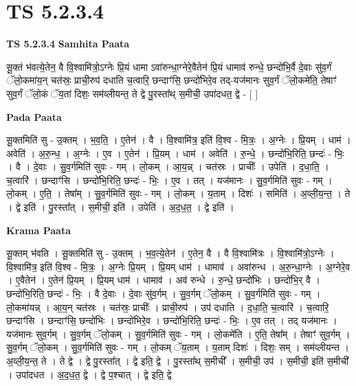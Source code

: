 \documentclass[17pt]{extarticle}
\begin{document}
\section{ TS 5.2.3.4 }

\textbf{TS 5.2.3.4 } \newline
\textbf{Samhita Paata} \newline

सू॒क्तं भ॑वत्ये॒तेन॒ वै वि॒श्वामि॑त्रो॒ऽग्नेः प्रि॒यं धामा ऽवा॑रुन्धा॒ग्नेरे॒वैतेन॑ प्रि॒यं धामाव॑ रुन्धे॒ छन्दो॑भि॒र्वै दे॒वाः सु॑व॒र्गं ॅलो॒कमा॑य॒न् चत॑स्रः॒ प्राची॒रुप॑ दधाति च॒त्वारि॒ छन्दाꣳ॑सि॒ छन्दो॑भिरे॒व तद्-यज॑मानः सुव॒र्गं ॅलो॒कमे॑ति॒ तेषाꣳ॑ सुव॒र्गं ॅलो॒कं ॅय॒तां दिशः॒ सम॑व्लीयन्त॒ ते द्वे पु॒रस्ता᳚थ् स॒मीची॒ उपा॑दधत॒ द्वे - [  ] \newline

\textbf{Pada Paata} \newline

सू॒क्तमिति॑ सु - उ॒क्तम् । भ॒व॒ति॒ । ए॒तेन॑ । वै । वि॒श्वामि॑त्र॒ इति॑ वि॒श्व - मि॒त्रः॒ । अ॒ग्नेः । प्रि॒यम् । धाम॑ । अवेति॑ । अ॒रु॒न्ध॒ । अ॒ग्नेः । ए॒व । ए॒तेन॑ । प्रि॒यम् । धाम॑ । अवेति॑ । रु॒न्धे॒ । छन्दो॑भि॒रिति॒ छन्दः॑ - भिः॒ । वै । दे॒वाः । सु॒व॒र्गमिति॑ सुवः - गम् । लो॒कम् । आ॒य॒न्न् । चत॑स्रः । प्राचीः᳚ । उपेति॑ । द॒धा॒ति॒ । च॒त्वारि॑ । छन्दाꣳ॑सि । छन्दो॑भि॒रिति॒ छन्दः॑ - भिः॒ । ए॒व । तत् । यज॑मानः । सु॒व॒र्गमिति॑ सुवः - गम् । लो॒कम् । ए॒ति॒ । तेषा᳚म् । सु॒व॒र्गमिति॑ सुवः - गम् । लो॒कम् । य॒ताम् । दिशः॑ । समिति॑ । अ॒व्ली॒य॒न्त॒ । ते । द्वे इति॑ । पु॒रस्ता᳚त् । स॒मीची॒ इति॑ । उपेति॑ । अ॒द॒ध॒त॒ । द्वे इति॑ ।  \newline


\textbf{Krama Paata} \newline

सू॒क्तम् भ॑वति । सू॒क्तमिति॑ सु - उ॒क्तम् । भ॒व॒त्ये॒तेन॑ । ए॒तेन॒ वै । वै वि॒श्वामि॑त्रः । वि॒श्वामि॑त्रो॒ऽग्नेः । वि॒श्वामि॑त्र॒ इति॑ वि॒श्व - मि॒त्रः॒ । अ॒ग्नेः प्रि॒यम् । प्रि॒यम् धाम॑ । धामाव॑ । अवा॑रुन्ध । अ॒रु॒न्धा॒ग्नेः । अ॒ग्नेरे॒व । ए॒वैतेन॑ । ए॒तेन॑ प्रि॒यम् । प्रि॒यम् धाम॑ । धामाव॑ । अव॑ रुन्धे । रु॒न्धे॒ छन्दो॑भिः । छन्दो॑भि॒र् वै । छन्दो॑भि॒रिति॒ छन्दः॑ - भिः॒ । वै दे॒वाः । दे॒वाः सु॑व॒र्गम् । सु॒व॒र्गम् ॅलो॒कम् । सु॒व॒र्गमिति॑ सुवः - गम् । लो॒कमा॑यन्न् । आ॒य॒न् चत॑स्रः । चत॑स्रः॒ प्राचीः᳚ । प्राची॒रुप॑ । उप॑ दधाति । द॒धा॒ति॒ च॒त्वारि॑ । च॒त्वारि॒ छन्दाꣳ॑सि । छन्दाꣳ॑सि॒ छन्दो॑भिः । छन्दो॑भिरे॒व । छन्दो॑भि॒रिति॒ छन्दः॑ - भिः॒ । ए॒व तत् । तद् यज॑मानः । यज॑मानः सुव॒र्गम् । सु॒व॒र्गम् ॅलो॒कम् । सु॒व॒र्गमिति॑ सुवः - गम् । लो॒कमे॑ति । ए॒ति॒ तेषा᳚म् । तेषाꣳ॑ सुव॒र्गम् । सु॒व॒र्गम् ॅलो॒कम् । सु॒व॒र्गमिति॑ सुवः - गम् । लो॒कम् ॅय॒ताम् । य॒ताम् दिशः॑ । दिशः॒ सम् । सम॑व्लीयन्त । अ॒व्ली॒य॒न्त॒ ते । ते द्वे । द्वे पु॒रस्ता᳚त् । द्वे इति॒ द्वे । पु॒रस्ता᳚थ् स॒मीची᳚ । स॒मीची॒ उप॑ । स॒मीची॒ इति॑ स॒मीची᳚ । उपा॑दधत । अ॒द॒ध॒त॒ द्वे । द्वे प॒श्चात् । द्वे इति॒ द्वे \newline
\end{document}
